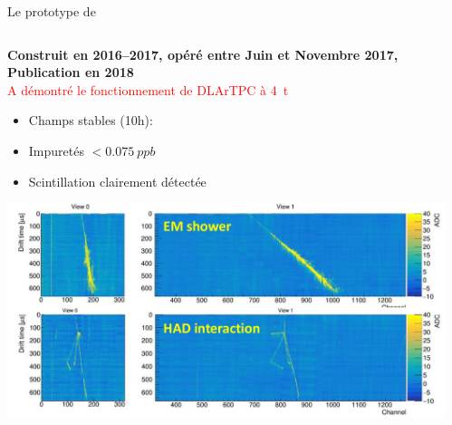    	\begin{frame}{Le prototype de \TOO{}}
       	\begin{scriptsize}
           	\begin{columns}
               	\begin{column}{0.5\textwidth}
                   	\textbf{Construit en 2016--2017, opéré entre Juin et Novembre 2017, Publication en 2018}\\
                   	\textcolor{red}{A démontré le fonctionnement de DLArTPC à \SI{4}{\tonne}}
       	           	\begin{itemize}
       	               	\item Champs stables (10h):
       	               	\begin{itemize}
       	               	\end{itemize}
       	               	\item Impuretés $<\SI{0.075}{ppb}$
       	               	\item Scintillation clairement détectée
       	           	\end{itemize}
       	           	\hspace{-0.3cm}\includegraphics[width=1.2\textwidth]{./pictures/events.png}
               	\end{column}
               	\begin{column}{0.5\textwidth}

\end{column}
\end{columns}
\end{scriptsize}
\end{frame}
